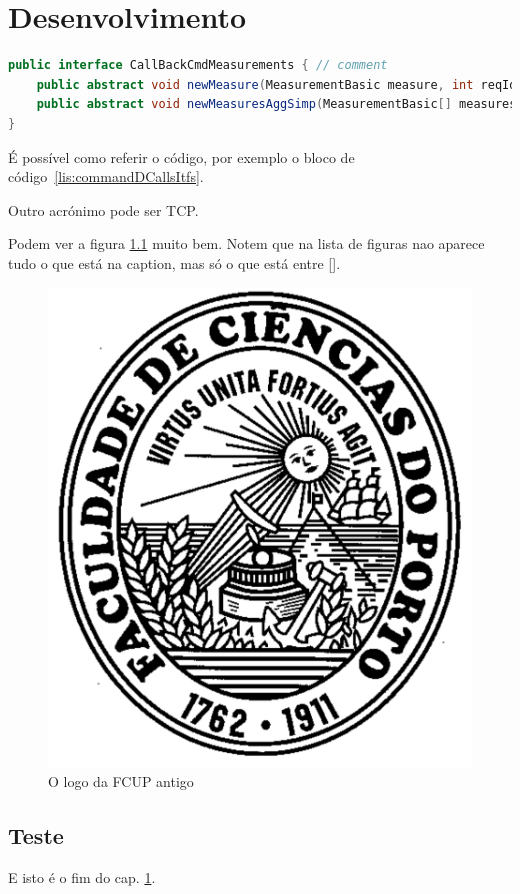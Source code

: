 \chapter{Desenvolvimento}\label{chap:dese}

\begin{lstlisting}[numbers=none,language=java,caption={[CommandDaemonCallsItf]
   {CommandDaemon} callback interfaces},label=lis:commandDCallsItfs,float=htb]
public interface CallBackCmdMeasurements { // comment
	public abstract void newMeasure(MeasurementBasic measure, int reqId);
	public abstract void newMeasuresAggSimp(MeasurementBasic[] measuresAggSimp, 'A string');
}
\end{lstlisting}

É possível como referir o código, por exemplo o bloco de código~\ref{lis:commandDCallsItfs}.

Outro acrónimo pode ser \ac{TCP}.

Podem ver a figura \ref{fig:logoFCUP} muito bem. Notem que na lista de figuras nao aparece tudo o que está na caption, mas só o que está entre [].



\begin{figure}[htb]
   \centering
   \includegraphics[scale=.4]{pics/fc_logo}
   \caption[FCUP logo velho]{O logo da FCUP antigo}\label{fig:logoFCUP}
\end{figure}


\lipsum[3-7]
\section{Teste}
\lipsum[1]
E isto é o fim do cap. \ref{chap:dese}.


